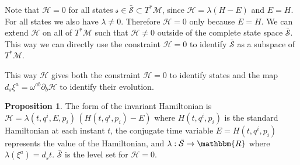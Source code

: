 \documentclass[aps,pra,10pt,twocolumn,floatfix,nofootinbib]{revtex4-1}
\numberwithin{equation}{section}
\theoremstyle{definition}
\newtheorem{prop}[equation]{Proposition}
\begin{document}
Note that $\mathcal{H}=0$ for all states $\mathcal{s} \in \bar{\mathcal{S}} \subset T^* \mathcal{M}$, since $\mathcal{H}=\lambda(H-E)$ and $E = H$. For all states we also have $\lambda \neq 0$. Therefore $\mathcal{H}=0$ only because $E = H$. We can extend $\mathcal{H}$ on all of $T^* \mathcal{M}$ such that $\mathcal{H} \neq 0$ outside of the complete state space $\bar{\mathcal{S}}$. This way we can directly use the constraint $\mathcal{H}=0$ to identify $\bar{\mathcal{S}}$ as a subspace of $T^* \mathcal{M}$.

This way $\mathcal{H}$ gives both the constraint $\mathcal{H}=0$ to identify states and the map $d_s \xi^a=\omega^{ab} \partial_b \mathcal{H}$ to identify their evolution.

\begin{prop}\label{form_of_extended_hamiltonian}
	The form of the invariant Hamiltonian is $\mathcal{H} = \lambda(t,q^i,E,p_i) \, (H(t,q^i,p_i) - E)$ where $H(t,q^i,p_i)$ is the standard Hamiltonian at each instant $t$, the conjugate time variable $E = H(t,q^i,p_i)$ represents the value of the Hamiltonian, and  $\lambda : \bar{\mathcal{S}} \rightarrow \mathbbm{R}$ where $\lambda(\xi^a) = d_s t$. $\bar{\mathcal{S}}$ is the level set for $\mathcal{H} = 0$.
\end{prop}
\end{document}
